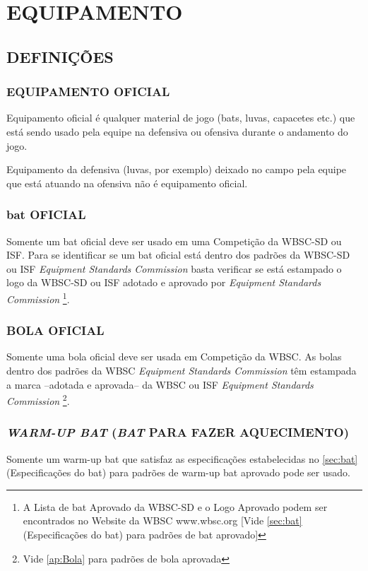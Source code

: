 
\chapter{EQUIPAMENTO}
	\section{DEFINI\c{C}\~OES}

	
	\subsection{EQUIPAMENTO OFICIAL}
	Equipamento oficial \'e qualquer material de jogo (\glspl{bat}, luvas, capacetes etc.) que 
	est\'a sendo usado pela equipe na defensiva ou ofensiva durante o andamento do jogo. 
	
	Equipamento da defensiva (luvas, por exemplo) deixado no campo pela equipe que 
	est\'a atuando na ofensiva n\~ao \'e equipamento oficial. 


	
	\subsection{\Gls{bat} OFICIAL }\label{bat-oficial}
	Somente um \gls{bat} oficial deve ser usado em uma Competi\c{c}\~ao da WBSC-SD ou ISF. 
	Para se identificar se um \gls{bat} oficial est\'a dentro dos padr\~oes da WBSC-SD ou ISF \textit{Equipment Standards Commission} basta verificar se est\'a estampado o logo da WBSC-SD ou ISF adotado e aprovado por \textit{Equipment Standards Commission} 
	\footnote{A Lista de \Gls{bat} Aprovado da WBSC-SD e o Logo Aprovado podem ser encontrados no Website da WBSC www.wbsc.org [Vide \autoref{sec:bat} (Especifica\c{c}\~oes do \Gls{bat}) para padr\~oes de \gls{bat} aprovado]}. 

	\subsection{BOLA OFICIAL}
	Somente uma bola oficial deve ser usada em Competi\c{c}\~ao da WBSC. 
	As bolas dentro dos padr\~oes da WBSC \textit{Equipment Standards Commission} t\^em estampada a marca –adotada e aprovada– da WBSC ou ISF \textit{Equipment Standards Commission}
	\footnote{Vide \autoref{ap:Bola} para padr\~oes de bola aprovada}. 
	
	\subsection{\textit{WARM-UP BAT} (\textit{BAT} PARA FAZER AQUECIMENTO)} 
	Somente um \gls{warm-up bat} que satisfaz as especifica\c{c}\~oes estabelecidas no \autoref{sec:bat} (Espe\-ci\-fi\-ca\-\c{c}\~oes do \Gls{bat}) para padr\~oes de \gls{warm-up bat} aprovado pode ser usado. 
	
